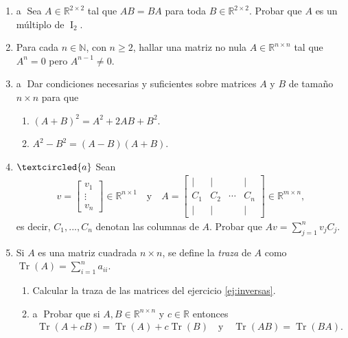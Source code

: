 \begin{enumerate}[topsep=6pt,itemsep=.4cm]
\item\label{2x2 central} \textcircled{a} Sea $A \in\mathbb{R}^{2\times 2}$ tal que $AB=BA$ para toda $B\in\mathbb{R}^{2\times 2}$. Probar que $A$ es un múltiplo de $\operatorname{I}_2$.


\item  Para cada $n\in\mathbb{N}$, con $n\geq 2$, hallar una matriz no nula $A\in\mathbb{R}^{n\times n}$ tal que $A^n=0$ pero $A^{n-1}\neq0$.


\item\label{eq:binomio} \textcircled{a} Dar condiciones necesarias y suficientes sobre matrices $A$ y $B$ de tama\~{n}o $n\times n$ para que
\begin{multicols}{2}
    \begin{enumerate}
        \item $(A + B)^2 = A^2 + 2AB + B^2$.
        \item $A^2 - B^2 = (A - B)(A + B)$.
    \end{enumerate}
\end{multicols}


\item\label{ej:multiplicar por columna} $\textcircled{a}$ Sean
\begin{align*}
v=\begin{bmatrix} v_1 \\ \vdots \\ v_n
\end{bmatrix}\in\mathbb{R}^{n\times1}
\quad\mbox{y}\quad A=\begin{bmatrix} \mid& \mid& &\mid\\ C_1 & C_2 & \cdots &C_n\\ \mid& \mid& &\mid\end{bmatrix}
\in\mathbb{R}^{m\times n},
\end{align*}
es decir, $C_1, ..., C_n$ denotan las columnas de $A$. Probar que $Av=\sum_{j=1}^nv_jC_j$.


\item\label{traza} Si $A$ es una matriz cuadrada $n\times n$, se define la {\it \textit{traza}} de $A$
como $\operatorname{Tr}(A)=\displaystyle{\sum_{i=1}^n} a_{ii}$.
\begin{enumerate}[topsep=5pt,itemsep=5pt]
 \item Calcular la traza de las matrices del ejercicio  \ref{ej:inversas}.
 \item\label{ej:traza}\textcircled{a} Probar que si $A,B\in\mathbb{R}^{n\times n}$ y $c\in\mathbb{R}$ entonces
 \begin{align*}
 \operatorname{Tr}(A+cB)=\operatorname{Tr}(A)+c\operatorname{Tr}(B)
 \quad\mbox{y}\quad
 \operatorname{Tr}(AB)=\operatorname{Tr}(BA).
 \end{align*}
\end{enumerate}


\end{enumerate}

